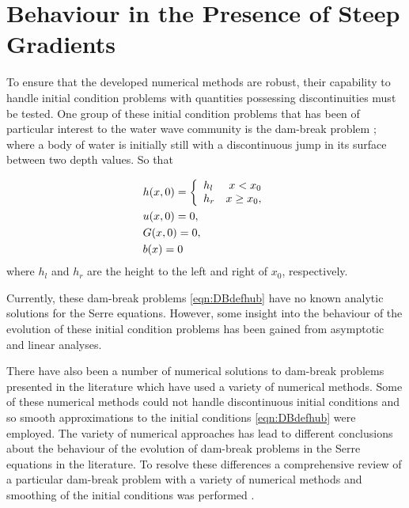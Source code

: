 \section{Behaviour in the Presence of Steep Gradients}
To ensure that the developed numerical methods are robust, their capability to handle initial condition problems with quantities possessing discontinuities must be tested. One group of these initial condition problems that has been of particular interest to the water wave community is the dam-break problem \cite{El-etal-2006,Hank-etal-2010-2034,Mitsotakis-etal-2014,Mitsotakis-etal-2017,doCarmo-etal-2018-404}; where a body of water is initially still with a discontinuous jump in its surface between two depth values. So that

\begin{subequations}
	\begin{align}
	&h(x,0) =\left\lbrace \begin{array}{l r}
	h_l & x < x_0 \\
	h_r & x \ge x_0,
	\end{array} \right. \\
	&u(x,0) = 0 , \\
	&G(x,0) = 0 , \\
	&b(x) = 0
	\end{align}
	\label{eqn:DBdefhub}
\end{subequations} 
where $h_l$ and $h_r$ are the height to the left and right of $x_0$, respectively. 

Currently, these dam-break problems \eqref{eqn:DBdefhub} have no known analytic solutions for the Serre equations. However, some insight into the behaviour of the evolution of these initial condition problems has been gained from asymptotic \cite{El-etal-2006} and linear \cite{Dougalis-etal-2007} analyses. 

There have also been a number of numerical solutions to dam-break problems presented in the literature \cite{El-etal-2006,Hank-etal-2010-2034,Mitsotakis-etal-2014,Mitsotakis-etal-2017,doCarmo-etal-2018-404} which have used a variety of numerical methods. Some of these numerical methods could not handle discontinuous initial conditions \cite{El-etal-2006,Mitsotakis-etal-2014,Mitsotakis-etal-2017,doCarmo-etal-2018-404} and so smooth approximations to the initial conditions \eqref{eqn:DBdefhub} were employed. The variety of numerical approaches has lead to different conclusions about the behaviour of the evolution of dam-break problems in the Serre equations in the literature. To resolve these differences a comprehensive review of a particular dam-break problem with a variety of numerical methods and smoothing of the initial conditions was performed \cite{Pitt-2018-61}. 

